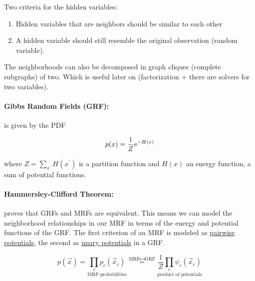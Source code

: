 Two criteria for the hidden variables: 
\begin{enumerate}
	\item Hidden variables that are neighbors should be similar to each other 
	\item A hidden variable should still resemble the original observation (random variable).	
\end{enumerate}

The neighborhoods can also be decomposed in graph cliques (complete subgraphs) of two. Which is useful later on (factorization + there are solvers for two variables).

\paragraph{Gibbs Random Fields (GRF):} is given by the PDF

\begin{equation*}
	p(x) = \frac{1}{Z} \mathrm{e}^{-H(x)}
\end{equation*}

where $Z = \sum_{x^\prime} H(x^{\prime})$ is a partition function and $H(x)$ an energy function, \ie a sum of potential functions.

%
%
%

\paragraph{Hammersley-Clifford Theorem:} proves that GRFs and MRFs are equivalent. This means we can model the neighborhood relationships in our MRF in terms of the energy and potential functions of the GRF. The first criterion of an MRF is modeled as \underline{pairwise potentials}, the second as \underline{unary potentials} in a GRF.

\begin{equation*}
	p(\vec{x}) = \underset{\text{MRF-probabilities}}{\prod_c p_c(\vec{x}_c)} \overset{\text{MRF} \Leftrightarrow \text{GRF}}{=} \underset{\text{product of potentials}}{\dfrac{1}{Z}\prod_c \psi_c(\vec{x}_c)} 
\end{equation*}

